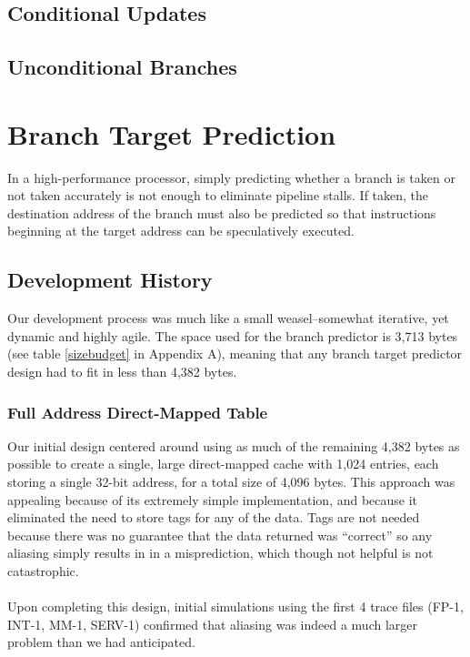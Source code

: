 \documentclass[twocolumn]{article}
\begin{document}
\subsection{Conditional Updates}
\subsection{Unconditional Branches}

\section{Branch Target Prediction}
In a high-performance processor, simply predicting whether a branch is taken or not taken accurately is not enough to eliminate pipeline stalls.  If taken, the destination address of the branch must also be predicted so that instructions beginning at the target address can be speculatively executed. 
 
\subsection{Development History}
Our development process was much like a small weasel--somewhat iterative, yet dynamic and highly agile.  The space used for the branch predictor is 3,713 bytes (see table \ref{sizebudget} in Appendix A), meaning that any branch target predictor design had to fit in less than 4,382 bytes.
\subsubsection{Full Address Direct-Mapped Table}
Our initial design centered around using as much of the remaining 4,382 bytes as possible to create a single, large direct-mapped cache with 1,024 entries, each storing a single 32-bit address, for a total size of 4,096 bytes.  This approach was appealing because of its extremely simple implementation, and because it eliminated the need to store tags for any of the data.  Tags are not needed because there was no guarantee that the data returned was ``correct'' so any aliasing simply results in in a misprediction, which though not helpful is not catastrophic. \\\\
Upon completing this design, initial simulations using the first 4 trace files (FP-1, INT-1, MM-1, SERV-1) confirmed that aliasing was indeed a much larger problem than we had anticipated.
\end{document}
